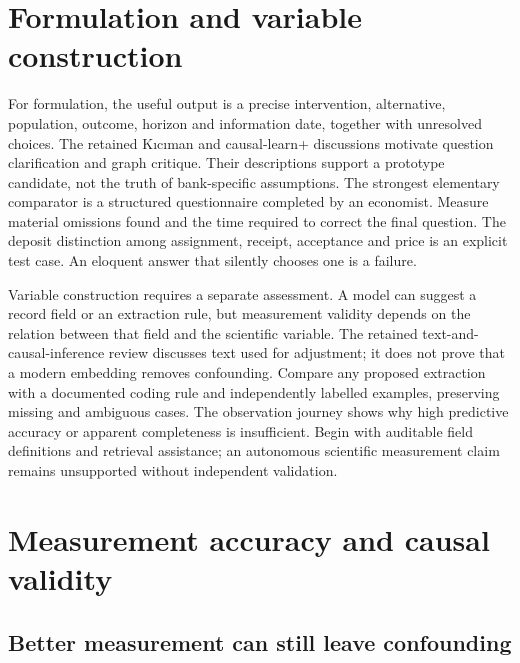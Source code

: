 \section{Formulation and variable construction}
For formulation, the useful output is a precise intervention, alternative,
population, outcome, horizon and information date, together with unresolved
choices. The retained Kıcıman and causal-learn+ discussions motivate
question clarification and graph critique. Their descriptions support
a prototype candidate, not the truth of bank-specific assumptions.
\citep{v12_la_2305_00050,v12_la_2606_23608}
The strongest elementary comparator is a structured questionnaire completed
by an economist. Measure material omissions found and the time required
to correct the final question. The deposit distinction among assignment,
receipt, acceptance and price is an explicit test case. An eloquent
answer that silently chooses one is a failure.

Variable construction requires a separate assessment. A model can suggest
a record field or an extraction rule, but measurement validity depends
on the relation between that field and the scientific variable. The
retained text-and-causal-inference review discusses text used for adjustment;
it does not prove that a modern embedding removes confounding.
\citep{exec13_census_text_review_arxiv}
Compare any proposed extraction with a documented coding rule and
independently labelled examples, preserving missing and ambiguous cases.
The observation journey shows why high predictive accuracy or apparent
completeness is insufficient. Begin with auditable field definitions and
retrieval assistance; an autonomous scientific measurement claim remains
unsupported without independent validation.



\section{Measurement accuracy and causal validity}
\label{reading:assistance-conclusions}

\subsection{Better measurement can still leave confounding}

